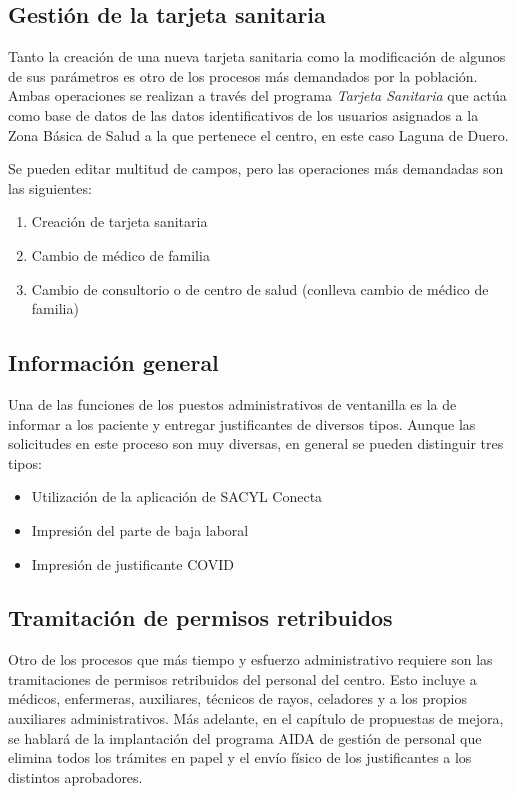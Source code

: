 \subsection{Gestión de la tarjeta sanitaria}

Tanto la creación de una nueva tarjeta sanitaria como la modificación de algunos de sus parámetros es otro de los procesos más demandados por la población. Ambas operaciones se realizan a través del programa \textit{Tarjeta Sanitaria} que actúa como base de datos de las datos identificativos de los usuarios asignados a la Zona Básica de Salud a la que pertenece el centro, en este caso Laguna de Duero.

Se pueden editar multitud de campos, pero las operaciones más demandadas son las siguientes:

\begin{enumerate}
    \item Creación de tarjeta sanitaria
    \item Cambio de médico de familia
    \item Cambio de consultorio o de centro de salud (conlleva cambio de médico de familia)
\end{enumerate}

\subsection{Información general}

Una de las funciones de los puestos administrativos de ventanilla es la de informar a los paciente y entregar justificantes de diversos tipos. Aunque las solicitudes en este proceso son muy diversas, en general se pueden distinguir tres tipos:

\begin{itemize}
    \item Utilización de la aplicación de SACYL Conecta
    \item Impresión del parte de baja laboral
    \item Impresión de justificante COVID
\end{itemize}

\subsection{Tramitación de permisos retribuidos}

Otro de los procesos que más tiempo y esfuerzo administrativo requiere son las tramitaciones de permisos retribuidos del personal del centro. Esto incluye a médicos, enfermeras, auxiliares, técnicos de rayos, celadores y a los propios auxiliares administrativos. Más adelante, en el capítulo de propuestas de mejora, se hablará de la implantación del programa AIDA de gestión de personal que elimina todos los trámites en papel y el envío físico de los justificantes a los distintos aprobadores.

